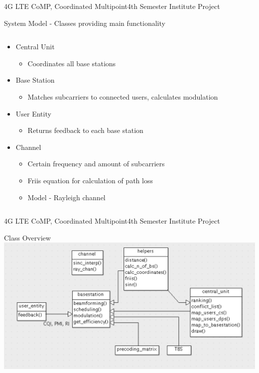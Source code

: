 \documentclass[xcolor={cmyk}]{beamer}
\begin{document}
 
  \begin{frame}{4G LTE CoMP, Coordinated Multipoint}{4th Semester Institute Project}
	 \begin{block}{System Model - Classes providing main functionality}
	 	\begin{columns}
			\begin{column}{.9\textwidth}
				\begin{itemize}
					\item Central Unit
					\begin{itemize}
						\item Coordinates all base stations 
					\end{itemize}
					\item Base Station
					\begin{itemize}
						\item Matches subcarriers to connected users, calculates modulation
					\end{itemize}
					\item User Entity
					\begin{itemize}
						\item Returns feedback to each base station
					\end{itemize}
					
					\item Channel
					\begin{itemize}
						\item Certain frequency and amount of subcarriers
						\item Friis equation for calculation of path loss
						\item Model - Rayleigh channel
					\end{itemize}
				\end{itemize}
			\end{column}
		\end{columns}
	 \end{block}
 \end{frame}
 
  \begin{frame}{4G LTE CoMP, Coordinated Multipoint}{4th Semester Institute Project}
	 \begin{block}{Class Overview}
		 \includegraphics[width=\linewidth,height=\textheight,keepaspectratio]{klassen.png}
	 \end{block}
 \end{frame}
\end{document}
